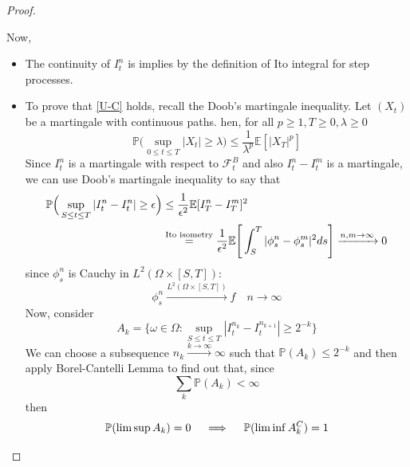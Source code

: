 \begin{proof}
\begin{itemize}
\begin{remark}
\begin{itemize}
        \end{itemize}
        \end{remark}
    \end{itemize}
    Now, 
    \begin{itemize}
        \item The continuity of $I_t^n$ is implies by the definition of Ito integral for step processes.
        \item To prove that \eqref{U-C} holds, recall the Doob's martingale inequality. Let $(X_t)$ be a martingale with continuous paths. hen, for all $p \geq 1, T \geq 0, \lambda \geq 0$
\begin{equation*}
    \mathbb{P}\Big(\sup_{0 \leq t \leq T} |X_t| \geq \lambda \Big) \leq \frac{1}{\lambda^p} \mathbb{E}[|X_T|^p]
\end{equation*}
 Since $I_t^n$ is a martingale with respect to $\mathcal{F}_t ^B$ and also $I_t ^n - I_t ^m$ is a martingale, we can use Doob's martingale inequality to say that 
    \begin{align*}
        \mathbb{P}\Big(\sup_{S \leq t \leq T} |I_t^n - I_t^n| \geq \epsilon \Big) &\leq \frac{1}{\epsilon^2} \mathbb{E}[I_T^n-I_T^m]^2\\
        & \stackrel{\text{Ito isometry}}= \frac{1}{\epsilon^2} \mathbb{E} \Bigg[\int_S^T |\phi_s^n - \phi_s^m|^2 ds \Bigg] \xrightarrow{n,m \rightarrow \infty} 0
    \end{align*}
    since $\phi_s^n$ is Cauchy in $L^2(\Omega \times [S,T])$:
    \begin{equation*}
        \phi_s^n \xrightarrow{L^2(\Omega \times [S,T])} f \quad n\rightarrow\infty
    \end{equation*}
    Now, consider  
    \begin{equation*}
        A_k = \{ \omega \in \Omega: \sup_{S \leq t \leq T} |I_t^{n_k} - I_t^{n_{k+1}}| \geq 2^{-k} \}
    \end{equation*}
    We can choose a subsequence $n_k \xrightarrow{k \rightarrow \infty} \infty$ such that $\mathbb{P}(A_k) \leq 2^{-k}$ and then apply Borel-Cantelli Lemma to find out that, since 
    \begin{equation*}
        \sum_k \mathbb{P}(A_k) < \infty
    \end{equation*}
    then
    \begin{equation}
    \label{liminf}
    \begin{split}
        &\mP(\limsup A_k)=0 \quad \implies \quad \mP(\liminf A_k^C)=1 \\
    \end{split}

\end{equation}
\end{itemize}
\end{proof}
